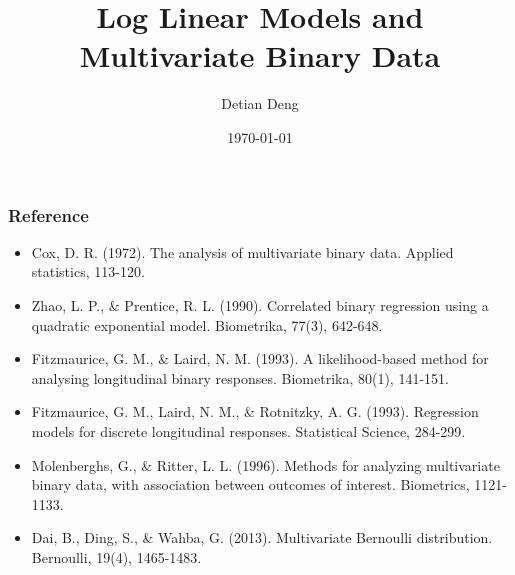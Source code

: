 \documentclass[]{beamer}
\title{Log Linear Models and Multivariate Binary Data }    %
\author{Detian Deng}                 %
\institute{Department of Biostatistics \\Johns Hopkins Bloomberg School of Public Health}      %
\date{\today}                    %
\newcommand\Fontvi{\fontsize{7}{7}\selectfont}
\begin{document}
\begin{frame}
  \titlepage
\end{frame}

\begin{frame}
\frametitle{Reference}
\Fontvi
\begin{itemize}
\item Cox, D. R. (1972). The analysis of multivariate binary data. Applied statistics, 113-120.
\item Zhao, L. P., \& Prentice, R. L. (1990). Correlated binary regression using a quadratic exponential model. Biometrika, 77(3), 642-648.
\item Fitzmaurice, G. M., \& Laird, N. M. (1993). A likelihood-based method for analysing longitudinal binary responses. Biometrika, 80(1), 141-151.
\item Fitzmaurice, G. M., Laird, N. M., \& Rotnitzky, A. G. (1993). Regression models for discrete longitudinal responses. Statistical Science, 284-299.
\item Molenberghs, G., \& Ritter, L. L. (1996). Methods for analyzing multivariate binary data, with association between outcomes of interest. Biometrics, 1121-1133.
\item Dai, B., Ding, S., \& Wahba, G. (2013). Multivariate Bernoulli distribution. Bernoulli, 19(4), 1465-1483.
\end{itemize}

\end{frame}

\section[Outline]{}

\begin{frame}
  \tableofcontents
\end{frame}
%
%
\end{document}
